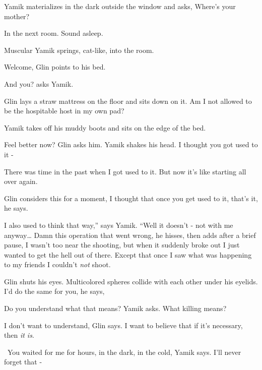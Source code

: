 \documentclass[letterpaper]{article}
\begin{document}
Yamik materializes in the dark outside the window and asks, {\textquotedbl}Where's your mother?{\textquotedbl} 

{\textquotedbl}In the next room. Sound asleep.{\textquotedbl} 

Muscular Yamik springs, cat-like, into the room. 

{\textquotedbl}Welcome,{\textquotedbl} Glin points to his bed. 

{\textquotedbl}And you?{\textquotedbl} asks Yamik.~ 

Glin lays a straw mattress on the floor and sits down on it. {\textquotedbl}Am I not allowed to be the hospitable host
in my own pad?{\textquotedbl}

Yamik takes off his muddy boots and sits on the edge of the bed. 

{\textquotedbl}Feel better now?{\textquotedbl} Glin asks him. Yamik shakes his
head.\textcolor[rgb]{0.0,0.4392157,0.7529412}{ }{\textquotedbl}I thought you got used to it -{\textquotedbl} 

{\textquotedbl}There was time in the past when I got used to it. But now it's like starting all over
again.{\textquotedbl} 

Glin considers this for a moment, {\textquotedbl}I thought that once you get used to it, that's it,{\textquotedbl} he
says.

{\textquotedbl}I also used to think that way,'' says Yamik. ``Well it doesn't - not with me anyway{\dots} Damn this
operation that went wrong,{\textquotedbl} he hisses, then adds after a brief pause,{\textquotedbl} I wasn't too near
the shooting, but when it suddenly\textcolor[rgb]{0.0,0.4392157,0.7529412}{ }broke out I
just\textcolor[rgb]{0.0,0.4392157,0.7529412}{ }wanted to get the hell out of there. Except that once I saw what was
happening to my friends I couldn't \textit{not} shoot.{\textquotedbl} 

Glin shuts his eyes. Multicolored spheres collide with each other under his eyelids. {\textquotedbl}I'd do the same for
you,{\textquotedbl} he says,

{\textquotedbl}Do you understand what that means?{\textquotedbl} Yamik asks. {\textquotedbl}What killing
means?{\textquotedbl} 

{\textquotedbl}I don't want to understand,{\textquotedbl} Glin says. {\textquotedbl}I want to believe that if it's
necessary, then \textit{it is}.{\textquotedbl}

~{\textquotedbl}You waited for me for hours, in the dark, in the cold,{\textquotedbl} Yamik says. {\textquotedbl}I'll
never forget that -{\textquotedbl} 
\end{document}
